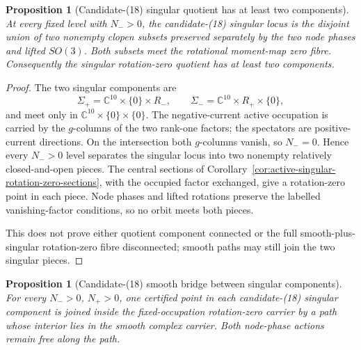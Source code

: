 \documentclass[11pt]{article}
\newtheorem{proposition}[theorem]{Proposition}
\theoremstyle{definition}
\theoremstyle{remark}
\begin{document}
\begin{proposition}[Candidate-(18) singular quotient has at least two components]
\label{prop:candidate-18-singular-component-separation}
At every fixed level with \(N_->0\), the candidate-(18) singular locus is
the disjoint union of two nonempty clopen subsets preserved separately by
the two node phases and lifted \(SO(3)\).  Both subsets meet the rotational
moment-map zero fibre.  Consequently the singular rotation-zero quotient has
at least two components.
\end{proposition}

\begin{proof}
The two singular components are
\[
 \Sigma_+=\mathbb C^{10}\times\{0\}\times R_-,
 \qquad
 \Sigma_-=\mathbb C^{10}\times R_+\times\{0\},
\]
and meet only in \(\mathbb C^{10}\times\{0\}\times\{0\}\).
The negative-current active occupation is carried by the \(g\)-columns of
the two rank-one factors; the spectators are positive-current directions.
On the intersection both \(g\)-columns vanish, so \(N_-=0\).  Hence every
\(N_->0\) level separates the singular locus into two nonempty relatively
closed-and-open pieces.  The central sections of
Corollary~\ref{cor:active-singular-rotation-zero-sections}, with the occupied
factor exchanged, give a rotation-zero point in each piece.  Node phases and
lifted rotations preserve the labelled vanishing-factor conditions, so no
orbit meets both pieces.

This does not prove either quotient component connected or the full
smooth-plus-singular rotation-zero fibre disconnected; smooth paths may still
join the two singular pieces.
\end{proof}

\begin{proposition}[Candidate-(18) smooth bridge between singular components]
\label{prop:candidate-18-singular-smooth-bridge}
For every \(N_->0\), \(N_+>0\), one certified point in each candidate-(18)
singular component is joined inside the fixed-occupation rotation-zero
carrier by a path whose interior lies in the smooth complex carrier.  Both
node-phase actions remain free along the path.
\end{proposition}
\end{document}
